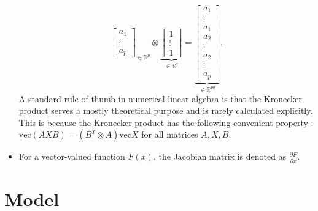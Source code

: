 \documentclass{article}
\begin{document}
\begin{itemize}
$${\begin{bmatrix}
            a_1 \\
            \vdots \\
            a_p
        \end{bmatrix}
        }_{\in \mathbb{R}^{p}}
        \otimes 
        \underbrace{
        \begin{bmatrix}
            1 \\
            \vdots \\
            1
        \end{bmatrix}
        }_{\in \mathbb{R}^{q}}
        =
        \underbrace{
        \begin{bmatrix}
            a_1 \\
            \vdots \\
            a_1 \\
            a_2 \\
            \vdots \\
            a_2 \\
            \vdots \\
            a_p
        \end{bmatrix}
        }_{\in \mathbb{R}^{pq}}
        .$$
        A standard rule of thumb in numerical linear algebra is that the Kronecker product serves a mostly theoretical purpose and is rarely calculated explicitly.
        This is because the Kronecker product has the following convenient property \cite[Section 12.3]{Golub2013}: $\mathrm{vec} (AXB) = (B^T \otimes A) \mathrm{vec} X$ for all matrices $A,X,B$.
    \item For a vector-valued function $F(x)$, the Jacobian matrix is denoted as $\frac{\partial F}{\partial x}$.
\end{itemize}

\section{Model}
\end{document}
